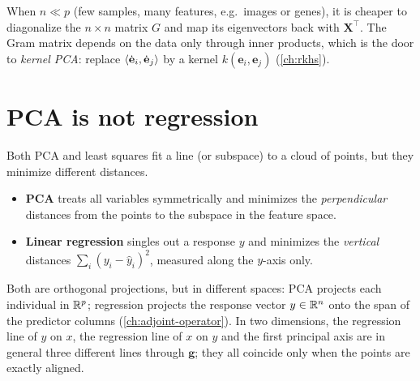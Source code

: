 \begin{notechapter}
When $n\ll p$ (few samples, many features, e.g.\ images or genes), it is cheaper to diagonalize the
$n\times n$ matrix $G$ and map its eigenvectors back with $\mathbf X^\top$. The Gram matrix depends on the
data only through inner products, which is the door to \emph{kernel PCA}: replace
$\left\langle \dot{\mathbf e}_i, \dot{\mathbf e}_j \right\rangle$ by a kernel $k(\mathbf e_i,\mathbf e_j)$ (\cref{ch:rkhs}).

\section{PCA is not regression}\label{pca-overview:sec:regression}

Both PCA and least squares fit a line (or subspace) to a cloud of points, but they minimize
different distances.
\begin{itemize}
  \item \textbf{PCA} treats all variables symmetrically and minimizes the \emph{perpendicular}
        distances from the points to the subspace in the feature space.
  \item \textbf{Linear regression} singles out a response $y$ and minimizes the \emph{vertical}
        distances $\sum_i(y_i - \hat y_i)^2$, measured along the $y$-axis only.
\end{itemize}
Both are orthogonal projections, but in different spaces: PCA projects each individual in
$\mathbb{R}^p$; regression projects the response vector $y\in\mathbb{R}^n$ onto the span of the predictor columns
(\cref{ch:adjoint-operator}). In two dimensions, the regression line of $y$ on $x$, the regression
line of $x$ on $y$ and the first principal axis are in general three different lines through
$\mathbf g$; they all coincide only when the points are exactly aligned.


\end{notechapter}
